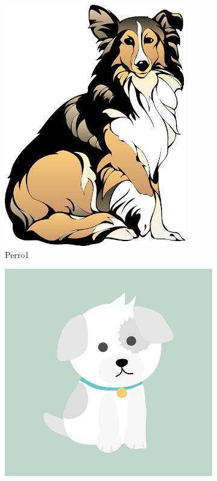 \documentclass{article}
\begin{document}
\begin{figure}[h!]
    \centering
    \begin{subfigure}[b]{0.47\linewidth}
        \includegraphics[width=\linewidth]{dog1.png}
        \caption{Perro1}
        \label{figs:perro1}
    \end{subfigure}
    \begin{subfigure}[b]{0.47\linewidth}
        \includegraphics[width=\linewidth]{dog2.jpg}

\end{subfigure}
\end{figure}
\end{document}
